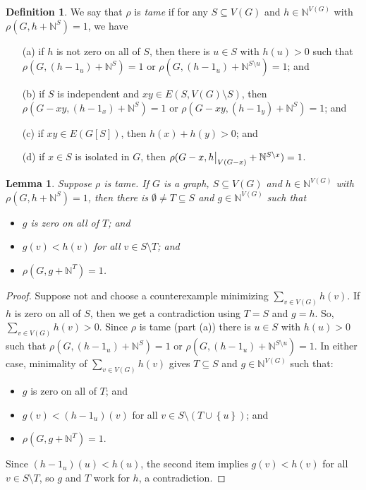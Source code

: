 \documentclass[12pt]{article}
\theoremstyle{plain}
\newtheorem{lem}[thm]{Lemma}
\theoremstyle{definition}
\newtheorem{defn}{Definition}
\theoremstyle{remark}
\newcommand{\IN}{\mathbb{N}}
\newcommand{\set}[1]{\left\{ #1 \right\}}
\newcommand\restr[2]{{%
  \left.\kern-\nulldelimiterspace %
  #1 %
  \vphantom{\big|} %
  \right|_{#2} %
  }}
\begin{document}
\begin{defn}\label{tame}
	We say that $\rho$ is \emph{tame} if for any $S \subseteq V(G)$ and $h \in \IN^{V(G)}$ with $\rho(G, h + \IN^S) = 1$, we have
\begin{enumerate}
	\item[(a)] if $h$ is not zero on all of $S$, then there is $u \in S$ with $h(u) > 0$ such that $\rho(G, (h - 1_u) + \IN^S) = 1$ or $\rho(G, (h - 1_u) + \IN^{S \setminus u}) = 1$; and
	\item[(b)] if $S$ is independent and $xy \in E(S, V(G)\setminus S)$, then $\rho(G-xy, (h - 1_x) + \IN^S) = 1$ or $\rho(G-xy, (h - 1_y) + \IN^S) = 1$; and
	\item[(c)] if $xy \in E(G[S])$, then $h(x) + h(y) > 0$; and
	\item[(d)] if $x \in S$ is isolated in $G$, then $\rho(G - x, \restr{h}{V(G-x)} + \IN^{S\setminus x}) = 1$.
\end{enumerate}
\end{defn}

\begin{lem}\label{GetSuperStable}
	Suppose $\rho$ is tame. If $G$ is a graph, $S \subseteq V(G)$ and $h \in \IN^{V(G)}$ with $\rho(G, h + \IN^S) = 1$, then there is $\emptyset \ne T \subseteq S$ and $g \in \IN^{V(G)}$ such that
	\begin{itemize}
		\item $g$ is zero on all of $T$; and
		\item $g(v) < h(v)$ for all $v \in S\setminus T$; and
		\item $\rho(G, g + \IN^T) = 1$.
	\end{itemize}
\end{lem}
\begin{proof}
	Suppose not and choose a counterexample minimizing $\sum_{v \in V(G)} h(v)$.  If $h$ is zero on all of $S$, then we get a contradiction using $T = S$ and $g=h$.  So, $\sum_{v \in V(G)} h(v) > 0$. Since $\rho$ is tame (part (a)) there is $u \in S$ with $h(u) > 0$ such that $\rho(G, (h - 1_u) + \IN^S) = 1$ or $\rho(G, (h - 1_u) + \IN^{S \setminus u}) = 1$.  In either case, minimality of  $\sum_{v \in V(G)} h(v)$ gives $T \subseteq S$ and $g \in \IN^{V(G)}$ such that:
		\begin{itemize}
			\item $g$ is zero on all of $T$; and
			\item $g(v) < (h - 1_u)(v)$ for all $v \in S\setminus (T \cup \set{u})$; and
			\item $\rho(G, g + \IN^T) = 1$.
		\end{itemize}
		Since $(h - 1_u)(u) < h(u)$, the second item implies $g(v) < h(v)$ for all $v \in S\setminus T$, so $g$ and $T$ work for $h$, a contradiction.
\end{proof}
\end{document}
